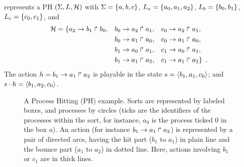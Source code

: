 \begin{example}
 represents a PH $(\Sigma,L,\mathcal{H})$ with
$\Sigma = \{a,b,c\}$,
$L_a = \{a_0,a_1,a_2\}$,
$L_b = \{b_0, b_1\}$,
$L_c = \{c_0, c_1\}$, and
\begin{align*}
\mathcal{H} & = \{
	a_2\rightarrow b_1\Rsh b_0,
&&  b_0\rightarrow a_2\Rsh a_1,
&&	c_0\rightarrow a_2\Rsh a_1,\\
&&& b_0\rightarrow a_1\Rsh a_0,
&&	c_0\rightarrow a_1\Rsh a_0,\\
&&& b_1\rightarrow a_0\Rsh a_1,
&&	c_1\rightarrow a_0\Rsh a_1,\\
&&& b_1\rightarrow a_1\Rsh a_2,
&&	c_1\rightarrow a_1\Rsh a_2 \}\enspace.
\end{align*}
The action $h=b_1\rightarrow a_1\Rsh a_2$ is playable in the state
$s = \langle b_1,a_1,c_0 \rangle$; and $s\cdot h=\langle b_1,a_2,c_0 \rangle$.

\begin{figure}[t]
\centering
{}
\caption{\label{fig:runningPH-1}
A Process Hitting (PH) example.
Sorts are represented by labeled boxes, and processes by circles (ticks are
the identifiers of the processes within the sort, for instance, $a_0$ is the
process ticked $0$ in the box $a$).
An action (for instance $b_1\rightarrow a_1\Rsh a_2$) is represented by a pair of
directed arcs, having the hit part ($b_1$ to $a_1$) in plain line and the bounce
part ($a_1$ to $a_2$) in dotted line.
Here, actions involving $b_1$ or $c_1$ are in thick lines.
}
\end{figure}


\end{example}
